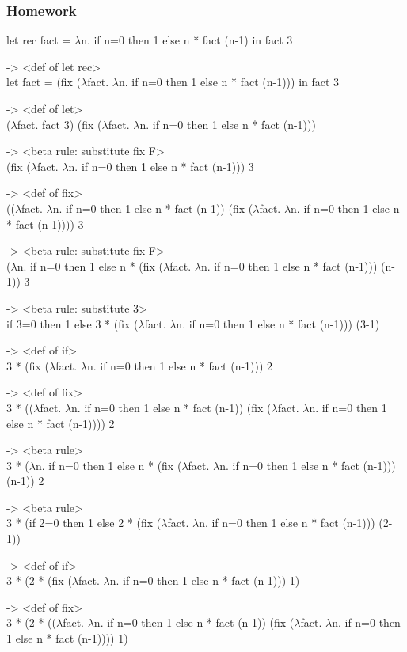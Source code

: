\documentclass{article}
\theoremstyle{theorem}
\theoremstyle{definition}
\theoremstyle{remark}
\begin{document}
\subsubsection{Homework}

let rec fact = $\lambda$n. if n=0 then 1 else n * fact (n-1) in fact 3

-> <def of let rec>\\
let fact = (fix ($\lambda$fact. $\lambda$n. if n=0 then 1 else n * fact (n-1))) in fact 3

-> <def of let>\\
($\lambda$fact. fact 3) (fix ($\lambda$fact. $\lambda$n. if n=0 then 1 else n * fact (n-1)))

-> <beta rule: substitute fix F>\\
(fix ($\lambda$fact. $\lambda$n. if n=0 then 1 else n * fact (n-1))) 3

-> <def of fix>\\
(($\lambda$fact. $\lambda$n. if n=0 then 1 else n * fact (n-1)) (fix ($\lambda$fact. $\lambda$n. if n=0 then 1 else n * fact (n-1)))) 3

-> <beta rule: substitute fix F>\\
($\lambda$n. if n=0 then 1 else n * (fix ($\lambda$fact. $\lambda$n. if n=0 then 1 else n * fact (n-1))) (n-1)) 3

-> <beta rule: substitute 3>\\
if 3=0 then 1 else 3 * (fix ($\lambda$fact. $\lambda$n. if n=0 then 1 else n * fact (n-1))) (3-1)

-> <def of if>\\
3 * (fix ($\lambda$fact. $\lambda$n. if n=0 then 1 else n * fact (n-1))) 2

-> <def of fix>\\
3 * (($\lambda$fact. $\lambda$n. if n=0 then 1 else n * fact (n-1)) (fix ($\lambda$fact. $\lambda$n. if n=0 then 1 else n * fact (n-1)))) 2

-> <beta rule>\\
3 * ($\lambda$n. if n=0 then 1 else n * (fix ($\lambda$fact. $\lambda$n. if n=0 then 1 else n * fact (n-1))) (n-1)) 2

-> <beta rule>\\
3 * (if 2=0 then 1 else 2 * (fix ($\lambda$fact. $\lambda$n. if n=0 then 1 else n * fact (n-1))) (2-1))

-> <def of if>\\
3 * (2 * (fix ($\lambda$fact. $\lambda$n. if n=0 then 1 else n * fact (n-1))) 1)

-> <def of fix>\\
3 * (2 * (($\lambda$fact. $\lambda$n. if n=0 then 1 else n * fact (n-1)) (fix ($\lambda$fact. $\lambda$n. if n=0 then 1 else n * fact (n-1)))) 1)
\end{document}
